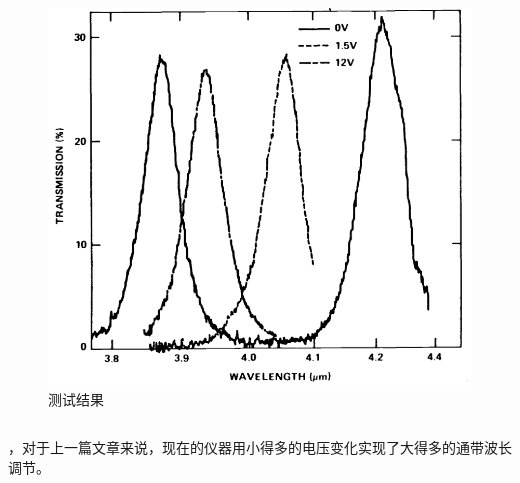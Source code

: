 \begin{frame}[c]
\begin{columns}
\begin{column}{.5\textwidth}
\begin{figure}[!htb]
                \includegraphics[width=1.\textwidth]{figures/A Liquid Crystal Tunable Spectral Filter Visible And Infrared Operation_3.png} %
                \caption{测试结果} %
            \end{figure}
        \end{column}
    \end{columns}
    \begin{itemize}
        ，对于上一篇文章来说，现在的仪器用小得多的电压变化实现了大得多的通带波长调节。
    \end{itemize}
\end{frame}